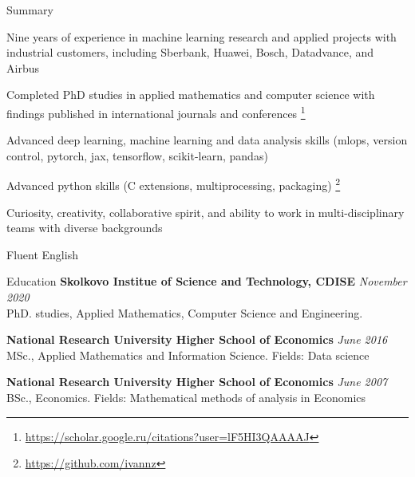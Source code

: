 \documentclass{resume} %
\begin{document}
\bigskip
\begin{rSection}{Summary}
    \item Nine years of experience in machine learning research and applied projects with industrial customers, including {Sberbank, Huawei, Bosch, Datadvance, and Airbus}


    \item Completed PhD studies in applied mathematics and computer science with findings published in international journals and conferences%
    \footnote{
        \url{https://scholar.google.ru/citations?user=lF5HI3QAAAAJ}
    }

    \item Advanced deep learning, machine learning and data analysis skills (mlops, version control, pytorch, jax, tensorflow, scikit-learn, pandas)

    \item Advanced python skills (C extensions, multiprocessing, packaging)%
    \footnote{
        \url{https://github.com/ivannz}
    }

    \item Curiosity, creativity, collaborative spirit, and ability to work in multi-disciplinary teams with diverse backgrounds

    \item Fluent English

\end{rSection}

\begin{rSection}{Education}
\textbf{Skolkovo Institue of Science and Technology, CDISE} \hfill \emph{November 2020} \\
PhD. studies, Applied Mathematics, Computer Science and Engineering.

\medskip
\textbf{National Research University Higher School of Economics} \hfill \emph{June 2016} \\
MSc., Applied Mathematics and Information Science. %
Fields: Data science

\medskip
\textbf{National Research University Higher School of Economics} \hfill \emph{June 2007} \\ 
BSc., Economics. %
Fields: Mathematical methods of analysis in Economics \\
\end{rSection}
\end{document}
